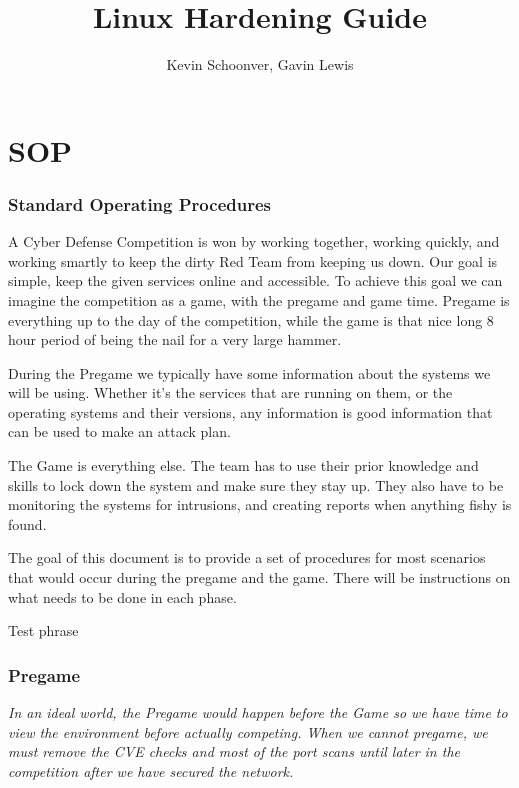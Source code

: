 \documentclass{article}
\title{\textbf{Linux Hardening Guide}}
\author{Kevin Schoonver, Gavin Lewis}
\begin{document}
\maketitle

\tableofcontents 

\pagebreak 

\part{SOP}

\section{Standard Operating Procedures}
A Cyber Defense Competition is won by working together, working quickly, and working
smartly to keep the dirty Red Team from keeping us down. Our goal is simple, keep the
given services online and accessible. To achieve this goal we can imagine the competition as
a game, with the pregame and game time. Pregame is everything up to the day of the competition,
while the game is that nice long 8 hour period of being the nail for a very large hammer.

During the Pregame we typically have some information about the systems we will be using. Whether
it's the services that are running on them, or the operating systems and their versions, any information
is good information that can be used to make an attack plan. 

The Game is everything else. The team has to use their prior knowledge and skills to lock down
the system and make sure they stay up. They also have to be monitoring the systems for intrusions, and creating reports when anything fishy is found.

The goal of this document is to provide a set of procedures for most scenarios that would
occur during the pregame and the game. There will be instructions on what needs to be done
in each phase.

Test phrase
\section{Pregame}
\textit{In an ideal world, the Pregame would happen before the Game so we have time to view the environment before actually competing. When we cannot pregame, we must remove the CVE checks and most of the port scans until later in the competition after we have secured the network.}
\end{document}
